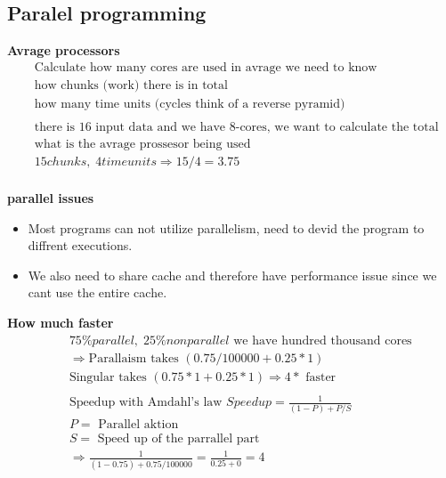 \subsection{Paralel programming}


\textbf{Avrage processors}
\begin{align*}
  &\quad  \text{Calculate how many cores are used in avrage we need to know } \\
  &\quad  \text{how chunks (work) there is in total } \\
  &\quad  \text{how many time units (cycles think of a reverse pyramid)} \\
  &\quad  \\
  &\quad  \text{there is 16 input data and we have 8-cores, we want to calculate the total sum} \\
  &\quad  \text{what is the avrage prossesor being used} \\
  &\quad  15 chunks, \; 4 time units \Rightarrow 15/4 = 3.75 \\
\end{align*}

\textbf{parallel issues}
\begin{itemize}
\item  Most programs can not utilize parallelism, need to devid the program to diffrent executions.
\item  We also need to share cache and therefore have performance issue since we cant use the entire cache.
\end{itemize}


\textbf{How much faster}
\begin{align*}
  &\quad  75\% parallel, \; 25\% non parallel \text{ we have hundred thousand cores } \\
  &\quad  \Rightarrow  \text{Parallaism takes } (0.75/100000 + 0.25*1) \\
  &\quad  \text{Singular takes } (0.75*1 + 0.25*1)  \Rightarrow 4* \text{ faster} \\
  &\quad  \\
  &\quad  \text{Speedup with Amdahl's law } Speedup=\frac{1}{(1-P)+P/S} \\
  &\quad  P= \text{ Parallel aktion} \\
  &\quad  S= \text{ Speed up of the parrallel part} \\
  &\quad  \Rightarrow \frac{1}{(1-0.75)+0.75/100000} = \frac{1}{0.25+0}= 4 \\
\end{align*}


